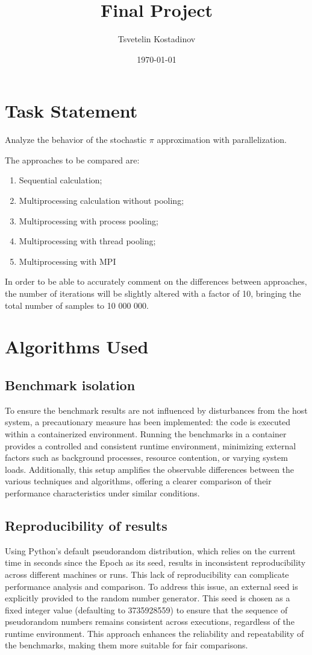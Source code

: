 \documentclass[a4paper, oneside]{article}
\title{Final Project}
\date{\today}
\author{Tsvetelin Kostadinov}
\begin{document}

\tableofcontents
\listoffigures
\listoftables
\newpage
\section{Task Statement}
Analyze the behavior of the stochastic $\pi$ approximation with parallelization.

The approaches to be compared are:
\begin{enumerate}
    \item Sequential calculation;
    \item Multiprocessing calculation without pooling;
    \item Multiprocessing with process pooling;
    \item Multiprocessing with thread pooling;
    \item Multiprocessing with MPI
\end{enumerate}

In order to be able to accurately comment on the differences between approaches, the number of iterations will be slightly altered with a factor of 10, bringing the total number of samples to 10 000 000.

\section{Algorithms Used}
\subsection{Benchmark isolation}
To ensure the benchmark results are not influenced by disturbances from the host system, a precautionary measure has been implemented: the code is executed within a containerized environment. Running the benchmarks in a container provides a controlled and consistent runtime environment, minimizing external factors such as background processes, resource contention, or varying system loads. Additionally, this setup amplifies the observable differences between the various techniques and algorithms, offering a clearer comparison of their performance characteristics under similar conditions.

\subsection{Reproducibility of results}
Using Python's default pseudorandom distribution, which relies on the current time in seconds since the Epoch as its seed, results in inconsistent reproducibility across different machines or runs. This lack of reproducibility can complicate performance analysis and comparison. To address this issue, an external seed is explicitly provided to the random number generator. This seed is chosen as a fixed integer value (defaulting to 3735928559) to ensure that the sequence of pseudorandom numbers remains consistent across executions, regardless of the runtime environment. This approach enhances the reliability and repeatability of the benchmarks, making them more suitable for fair comparisons.
\end{document}
